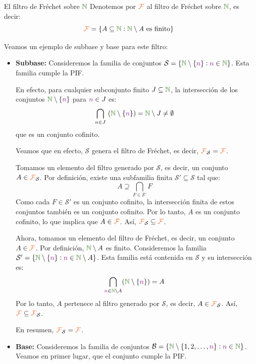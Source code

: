 \documentclass[titlepage,11pt,a4paper]{book}
\newcommand{\NN}{\ensuremath{\textcolor{OliveGreen}{\mathbb{N}}}}
\newcommand{\filt}{\ensuremath{\textcolor{Orange}{\mathcal{F}}}}
\newcommand{\nn}{\ensuremath{\textcolor{Plum}{n}}}
\newcommand{\borde}[1]{%
  \begingroup
  \setlength{\fboxsep}{2.5pt}%
  \setlength{\fboxrule}{1pt}%
  \textcolor{black}{\fbox{\normalcolor\ensuremath{#1}}}%
  \hspace{4pt}%
  \vspace{0.5 pt}
  \endgroup
}
\begin{document}
\begin{ejemplo*}{El filtro de Fréchet sobre \NN}
    Denotemos por $\filt$ al filtro de Fréchet sobre $\NN$, es decir:
    \[
    \filt = \{A \subseteq \NN : \NN \setminus A \text{ es finito}\}
    \]

    Veamos un ejemplo de subbase y base para este filtro:
    \begin{itemize}
        \item \textbf{Subbase:} Consideremos la familia de conjuntos $\mathcal S = \{\NN \setminus \{\nn\} : \nn \in \NN\}$. Esta familia cumple la PIF.

        \medskip
        En efecto, para cualquier subconjunto finito $J \subseteq \NN$, la intersección de los conjuntos $\NN \setminus \{\nn\}$ para $\nn \in J$ es:
        \[
        \bigcap_{n \in J} \  (\NN \setminus \{\nn\}) = \NN \setminus J \neq \emptyset
        \]
        que es un conjunto cofinito.
        
        \medskip
        Veamos que en efecto, $\mathcal S$ genera el filtro de Fréchet, es decir, $\filt_{\mathcal S} = \filt$.

        \medskip
        \borde{\subseteq} Tomamos un elemento del filtro generado por $\mathcal S$, es decir, un conjunto $A \in \filt_{\mathcal S}$. Por definición, existe una subfamilia finita $\mathcal S' \subseteq \mathcal S$ tal que:
        \[
        A \supseteq \bigcap_{F \in \mathcal S'} F
        \]
        Como cada $F \in \mathcal S'$ es un conjunto cofinito, la intersección finita de estos conjuntos también es un conjunto cofinito. Por lo tanto, $A$ es un conjunto cofinito, lo que implica que $A \in \filt$. Así, $\filt_{\mathcal S} \subseteq \filt$.

        \smallskip
        \borde{\supseteq} Ahora, tomamos un elemento del filtro de Fréchet, es decir, un conjunto $A \in \filt$. Por definición, $\NN \setminus A$ es finito. Consideremos la familia $\mathcal S' = \{\NN \setminus \{\nn\} : \nn \in \NN \setminus A\}$. Esta familia está contenida en $\mathcal S$ y su intersección es:
        \[
        \bigcap_{\nn \in \NN \setminus A} (\NN \setminus \{\nn\}) = A
        \]
        Por lo tanto, $A$ pertenece al filtro generado por $\mathcal S$, es decir, $A \in \filt_{\mathcal S}$. Así, $\filt \subseteq \filt_{\mathcal S}$.

        En resumen, $\filt_{\mathcal S} = \filt$.

        \medskip
        \item \textbf{Base:} Consideremos la familia de conjuntos $\mathcal B = \{\NN \setminus \{1, 2, \ldots, \nn\} : \nn \in \NN\}$. Veamos en primer lugar, que el conjunto cumple la PIF.
        

\end{itemize}
\end{ejemplo*}
\end{document}

